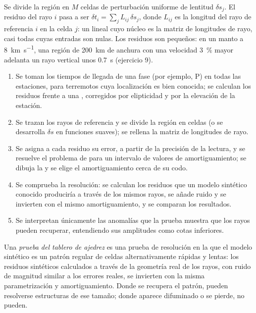 Se divide la región en $M$ celdas de perturbación uniforme de lentitud $\delta s_j$.
El residuo del rayo $i$ pasa a ser $\delta t_i = \sum_j L_{ij}\,\delta s_j$, donde
$L_{ij}$ es la longitud del rayo de referencia $i$ en la celda $j$: un  lineal
cuyo núcleo es la matriz de longitudes de rayo, casi todas cuyas entradas
son nulas. Los residuos son pequeños: en un manto a
\qty{8}{km.s^{-1}}, una región de \qty{200}{km} de anchura con una velocidad \qty{3}{\percent}
mayor adelanta un rayo vertical unos \qty{0.7}{s} (ejercicio 9).

\begin{method}\label{met:b3:seismology-imaging:tomo}
\begin{enumerate}
  \item Se toman los tiempos de llegada de una fase (por ejemplo, P) en todas las estaciones, para
        terremotos cuya localización es bien conocida; se calculan los residuos
        frente a una , corregidos por elipticidad y por la
        elevación de la estación.
  \item Se trazan los rayos de referencia y se divide la región en celdas (o se desarrolla
        $\delta s$ en funciones suaves); se rellena la matriz de longitudes de rayo.
  \item Se asigna a cada residuo su error, a partir de la precisión de la lectura, y se resuelve
        el problema de  para un intervalo de valores de amortiguamiento; se dibuja
        la  y se elige el amortiguamiento cerca de su codo.
  \item Se comprueba la resolución: se calculan los residuos que un modelo sintético conocido
        produciría a través de los mismos rayos, se añade ruido y se invierten
        con el mismo amortiguamiento, y se comparan los resultados.
  \item Se interpretan únicamente las anomalías que la prueba muestra que los rayos pueden
        recuperar, entendiendo sus amplitudes como cotas inferiores.
\end{enumerate}
\end{method}

\begin{definition}\label{def:b3:seismology-imaging:checkerboard}
Una \emph{prueba del tablero de ajedrez} es una prueba de resolución en
la que el modelo sintético es un patrón regular de celdas alternativamente rápidas y lentas:
los residuos sintéticos calculados a través de la geometría real de los rayos, con ruido
de magnitud similar a los errores reales, se invierten con la misma parametrización y
amortiguamiento. Donde se recupera el patrón, pueden resolverse estructuras de ese tamaño;
donde aparece difuminado o se pierde, no pueden.
\end{definition}

